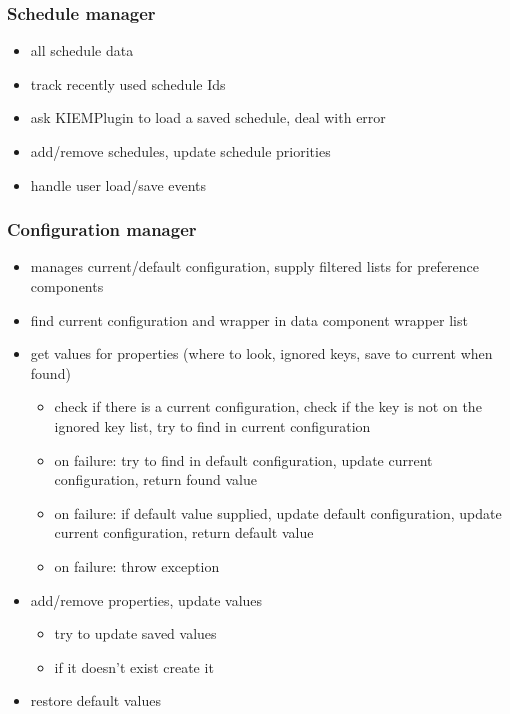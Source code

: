 \subsubsection{Schedule manager}
\begin{itemize}
 \item all schedule data
 \item track recently used schedule Ids
 \item ask KIEMPlugin to load a saved schedule, deal with error
 \item add/remove schedules, update schedule priorities
 \item handle user load/save events
\end{itemize}

\subsubsection{Configuration manager}
\begin{itemize}
 \item manages current/default configuration, supply filtered lists for preference components
 \item find current configuration and wrapper in data component wrapper list 
 \item get values for properties (where to look, ignored keys, save to current when found)
  \begin{itemize}
   \item check if there is a current configuration, check if the key is not on the ignored key list, try to find in current configuration
   \item on failure: try to find in default configuration, update current configuration, return found value
   \item on failure: if default value supplied, update default configuration, update current configuration, return default value
   \item on failure: throw exception
  \end{itemize}
 \item add/remove properties, update values
 \begin{itemize}
  \item try to update saved values
  \item if it doesn't exist create it
 \end{itemize}
 \item restore default values
\end{itemize}

